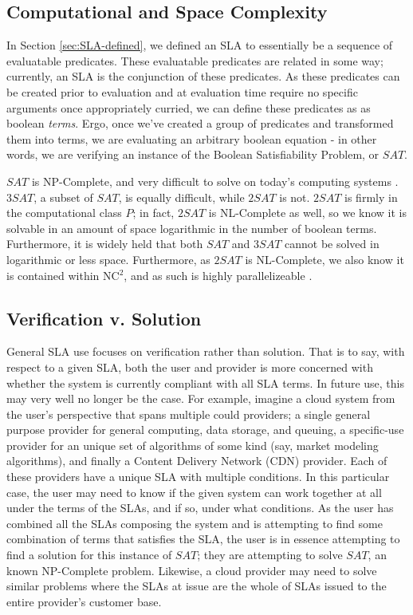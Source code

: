 \subsection{Computational and Space Complexity}
In Section \ref{sec:SLA-defined}, we defined an SLA to essentially be a sequence of evaluatable predicates.  These evaluatable predicates are related in some way; currently, an SLA is the conjunction of these predicates.  As these predicates can be created prior to evaluation and at evaluation time require no specific arguments once appropriately curried, we can define these predicates as as boolean {\it terms}.  Ergo, once we've created a group of predicates and transformed them into terms, we are evaluating an arbitrary boolean equation - in other words, we are verifying an instance of the Boolean Satisfiability Problem, or $ SAT $.

$ SAT $ is NP-Complete, and very difficult to solve on today's computing systems \cite{comptheory:sipser:intro-comp-theory}.  $ 3SAT $, a subset of $ SAT $, is equally difficult, while $ 2SAT $ is not.  $ 2SAT $ is firmly in the computational class $ P $; in fact, $ 2SAT $ is NL-Complete as well, so we know it is solvable in an amount of space logarithmic in the number of boolean terms\cite{comptheory:papadimitriou:computational-complexity}.  Furthermore, it is widely held that both $ SAT $ and $ 3SAT $ cannot be solved in logarithmic or less space.  Furthermore, as $ 2SAT $ is NL-Complete, we also know it is contained within NC$^{2}$, and as such is highly parallelizeable \cite{comptheory:papadimitriou:computational-complexity}.

\subsection{Verification v. Solution}
General SLA use focuses on verification rather than solution.  That is to say, with respect to a given SLA, both the user and provider is more concerned with whether the system is currently compliant with all SLA terms.  In future use, this may very well no longer be the case.  For example, imagine a cloud system from the user's perspective that spans multiple could providers; a single general purpose provider for general computing, data storage, and queuing, a specific-use provider for an unique set of algorithms of some kind (say, market modeling algorithms), and finally a Content Delivery Network (CDN) provider.  Each of these providers have a unique SLA with multiple conditions.  In this particular case, the user may need to know if the given system can work together at all under the terms of the SLAs, and if so, under what conditions.  As the user has combined all the SLAs composing the system and is attempting to find some combination of terms that satisfies the SLA, the user is in essence attempting to find a solution for this instance of $ SAT $; they are attempting to solve $ SAT $, an known NP-Complete problem.  Likewise, a cloud provider may need to solve similar problems where the SLAs at issue are the whole of SLAs issued to the entire provider's customer base.

